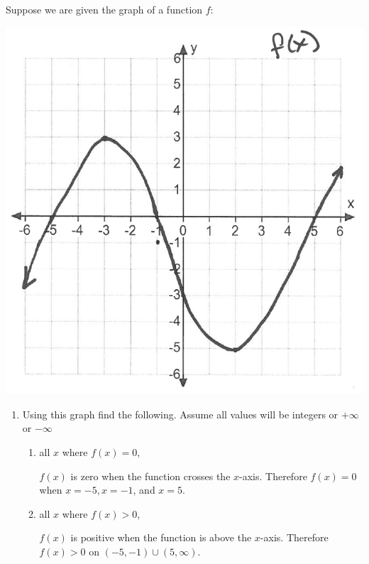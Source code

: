 \documentclass[nooutcomes]{ximera}
\begin{document}
	
\begin{problem}
  Suppose we are given the graph of a function $f$:
  \begin{image}
    \includegraphics[scale=.5]{Figure1.png}
  \end{image}
  \begin{enumerate}
    \item
      Using this graph find the following.  Assume all values will be integers or $+\infty$ or $-\infty$
      \begin{enumerate}
        \item 
          all $x$ where $f(x) = 0$,
          \begin{freeResponse}
            $f(x)$ is zero when the function crosses the $x$-axis.
            Therefore $f(x) = 0$ when $x = -5, x=-1$, and $x = 5$.
          \end{freeResponse}

        \item 
          all $x$ where $f(x) > 0$, 
          \begin{freeResponse}
            $f(x)$ is positive when the function is above the $x$-axis.
            Therefore $f(x) > 0$ on $(-5,-1) \cup (5,\infty)$. 
          \end{freeResponse}


\end{enumerate}
\end{enumerate}
\end{problem}
\end{document}
